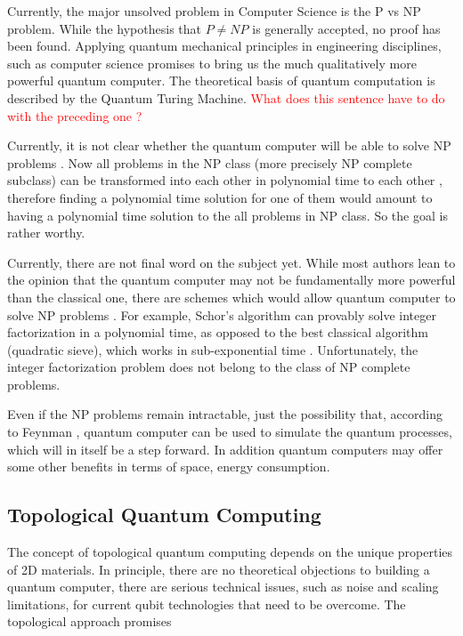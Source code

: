 Currently, the major unsolved problem in Computer Science is the P vs NP problem\cite{PvsNP}. While the hypothesis that $ P \neq NP $ is generally accepted, no proof has been found. Applying quantum mechanical principles in engineering disciplines, such as computer science\cite{FQC} promises to bring us the much qualitatively more powerful quantum computer. The theoretical basis of quantum computation is described by the Quantum Turing Machine\cite{QuantumTuring}. \textcolor{red}{What does this sentence have to do with the preceding one ?}

Currently, it is not clear whether the quantum computer will be able to solve NP problems\cite{QCvsNP} . Now all problems in the NP class (more precisely NP complete subclass) can be transformed into each other in polynomial time to each other \cite{NPComplete},  therefore finding a polynomial time solution for one of them would amount to having a polynomial time solution to the all problems in NP class. So the goal is rather worthy.

Currently, there are not final word on the subject yet. While most authors lean to the opinion that the quantum computer may not be fundamentally more powerful than the classical one, there are schemes \cite{NLQC} which would allow quantum computer to solve NP problems . For example,  Schor's algorithm \cite{Schor} can provably solve integer factorization in a polynomial time, as opposed to the best classical algorithm (quadratic sieve), which works in sub-exponential time \cite{Pomerance}. Unfortunately, the integer factorization problem does not belong to the class of NP complete problems. 

Even if the NP problems remain intractable, just the possibility that, according to Feynman \cite{FQC}, quantum computer can be used to simulate the quantum processes, which will in itself be a step forward. In addition quantum computers may offer some other benefits in terms of space, energy consumption. 

\subsection*{Topological Quantum Computing}
The concept of topological quantum computing \cite{Tqc1}
depends on the unique properties of 2D materials.  In principle, there are no theoretical objections to building a quantum computer, there are serious technical issues, such as noise
and scaling limitations, for current qubit technologies
that need to be overcome\cite{QCProblems}. 
The topological approach promises 

